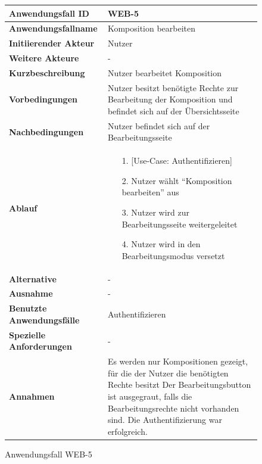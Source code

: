 \begin{figure}[h]
	\centering
	\begin{tabularx}{\textwidth}{ X | X }
		\textbf{Anwendungsfall ID} & WEB-5 \\ \hline
		\textbf{Anwendungsfallname} & Komposition bearbeiten \\ \hline
		\textbf{Initiierender Akteur} & Nutzer \\ \hline
		\textbf{Weitere Akteure} & - \\ \hline
		\textbf{Kurzbeschreibung} & Nutzer bearbeitet Komposition \\ \hline
		\textbf{Vorbedingungen} & Nutzer besitzt benötigte Rechte zur Bearbeitung der Komposition und befindet sich auf der Übersichtsseite \\ \hline
		\textbf{Nachbedingungen} & Nutzer befindet sich auf der Bearbeitungsseite \\ \hline
		\textbf{Ablauf} &
		\begin{enumerate}
			\item[1.] [Use-Case: Authentifizieren]
			\item[2.] Nutzer wählt ``Komposition bearbeiten'' aus
			\item[3.] Nutzer wird zur Bearbeitungsseite weitergeleitet
			\item[4.] Nutzer wird in den Bearbeitungsmodus versetzt
		\end{enumerate} \\ \hline
		\textbf{Alternative} & - \\ \hline
		\textbf{Ausnahme} & - \\ \hline
		\textbf{Benutzte Anwendungsfälle} & Authentifizieren \\ \hline
		\textbf{Spezielle Anforderungen} & - \\ \hline
		\textbf{Annahmen} & Es werden nur Kompositionen gezeigt, für die der Nutzer die benötigten Rechte besitzt
                  Der Bearbeitungsbutton ist ausgegraut, falls die Bearbeitungsrechte nicht vorhanden sind. Die Authentifizierung war erfolgreich.
	\end{tabularx}
	\caption{Anwendungsfall WEB-5}
	\label{fig:anwendungsfall-server-tabelle-web-5}
\end{figure}

